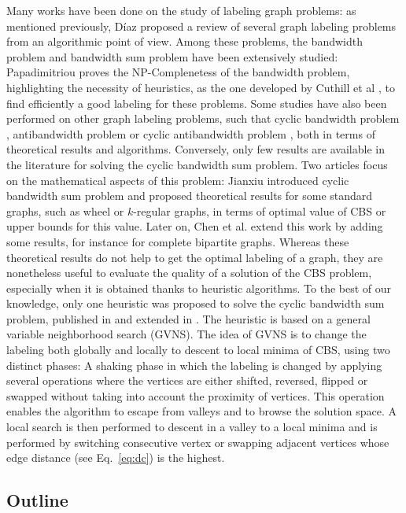 \documentclass{scrartcl}
\theoremstyle{plain}
\newcommand{\gvns}{GVNS}
\newcommand{\cbs}{CBS}
\begin{document}
Many works have been done on the study of labeling graph problems: as mentioned 
previously, D\'iaz \cite{Diaz2002} proposed a review of several graph labeling 
problems from an algorithmic point of view. Among these problems, the bandwidth 
problem and bandwidth sum problem have been extensively studied: Papadimitriou 
\cite{Papadimitriou1976} proves the NP-Complenetess of the bandwidth problem, 
highlighting the necessity of heuristics, as the one developed by Cuthill et al 
\cite{Cuthill1969}, to find efficiently a good labeling for these problems. Some 
studies have also been performed on other graph labeling problems, such that 
cyclic bandwidth problem \cite{Lin1994, Romero-Monsivais2013}, antibandwidth 
problem \cite{Calamoneri2006} or cyclic antibandwidth problem \cite{Lozano2013}, 
both in terms of theoretical results and algorithms. Conversely, only few 
results are available in the literature for solving the cyclic bandwidth sum 
problem. Two articles focus on the mathematical aspects of this problem: Jianxiu 
\cite{Jianxiu2001} introduced cyclic bandwidth sum problem and proposed 
theoretical results for some standard graphs, such as wheel or $k$-regular 
graphs, in terms of optimal value of \cbs{} or upper bounds for this value. 
Later on, Chen et al. \cite{Chen2007} extend this work by adding some results, 
for instance for complete bipartite graphs. Whereas these theoretical results do 
not help to get the optimal labeling of a graph, they are nonetheless useful to 
evaluate the quality of a solution of the \cbs{} problem, especially when it is 
obtained thanks to heuristic algorithms.  To the best of our knowledge, only one 
heuristic was proposed to solve the cyclic bandwidth sum problem, published in 
\cite{Satsangi2012} and extended in \cite{Satsangi2013}. The heuristic is based 
on a general variable neighborhood search (\gvns{}). The idea of \gvns{} is to 
change the labeling both globally and locally to descent to local minima of 
\cbs{}, using two distinct phases: A shaking phase in which the labeling is 
changed by applying several operations where the vertices are either shifted, 
reversed, flipped or swapped without taking into account the proximity of 
vertices. This operation enables the algorithm to escape from valleys and to 
browse the solution space. A local search is then performed to descent in a 
valley to a local minima and is performed by switching consecutive vertex or 
swapping adjacent vertices whose edge distance (see Eq.~\ref{eq:dc}) is the 
highest.

\subsection{Outline}
\end{document}
